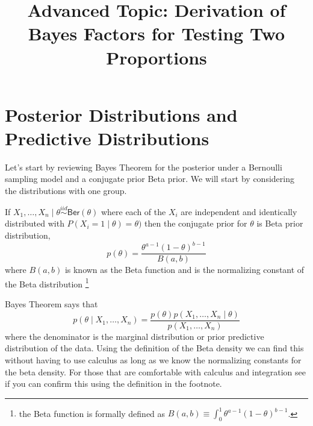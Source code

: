 \documentclass[11pt]{article}
\title{Advanced Topic:  Derivation of Bayes Factors for Testing Two Proportions}
\def\Ber{\textsf{Ber}}
\def\iid{\stackrel{iid}{\sim}}
\begin{document}


\maketitle 

\section*{Posterior Distributions and Predictive Distributions}
Let's start by reviewing Bayes Theorem for the posterior under a Bernoulli sampling model and a conjugate prior Beta prior. 
We will start by considering the distributions with one group.


If $X_{1}, \ldots, X_{n} \mid \theta \iid \Ber(\theta)$ 
where each of the $X_i$ are independent and identically distributed with $P(X_i = 1 \mid \theta) = \theta)$ then the conjugate prior for $\theta$ is Beta prior distribution,  
$$p(\theta) = \frac{\theta^{a-1} (1 - \theta)^{b-1}}{B(a,b)}$$
where $B(a,b)$ is known as the Beta function and is the normalizing constant of the
Beta distribution \footnote{the Beta function is formally defined as   
$B(a,b) \equiv \int_0^1 \theta^{a - 1} (1 - \theta)^{b-1}$.}
 

Bayes Theorem says that
$$p(\theta \mid X_1, \ldots, X_{n})  =  \frac{p(\theta) p(X_{1}, \ldots, X_{n} \mid \theta)}{p(X_1, \ldots, X_{n})}$$ 
where the denominator is the marginal distribution or prior predictive distribution of the data.  Using the definition of the Beta density we can find this without having to use calculus as long as we know the normalizing constants for the beta density.   For those that are comfortable with calculus and integration see if you can confirm this using the definition in the footnote.
\end{document}
